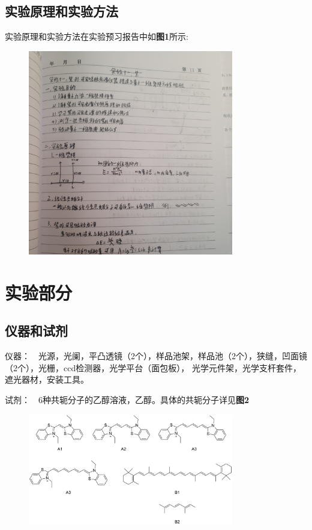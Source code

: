 \documentclass[12pt]{article}
\begin{document}
			\subsection{实验原理和实验方法}
				实验原理和实验方法在实验预习报告中如\textbf{图1}所示: \par
		\begin{figure}[h]
			\centering
			\includegraphics[width=0.8\textwidth]{1.png}
		\end{figure}

	     
    \section{实验部分}
    	\subsection{仪器和试剂}
    		仪器：\ \  光源，光阑，平凸透镜（2个），样品池架，样品池（2个），狭缝，凹面镜（2个），光栅，ccd检测器，光学平台（面包板），
			光学元件架，光学支杆套件，遮光器材，安装工具。\par
			试剂：\ \  6种共轭分子的乙醇溶液，乙醇。具体的共轭分子详见\textbf{图2}\par
    	\par
		\begin{figure}[h]
			\centering
			\includegraphics[width=0.8\textwidth]{2.png}
		\end{figure}
			\par
\end{document}
